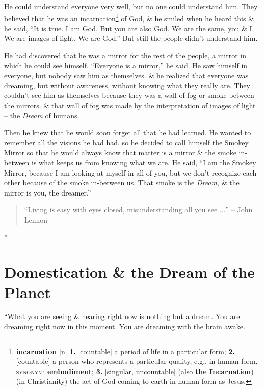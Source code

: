 \documentclass[oneside]{book}
\numberwithin{equation}{section}
\begin{document}
He could understand everyone very well, but no one could understand him. They believed that he was an incarnation\footnote{\textbf{incarnation} [n] \textbf{1.} [countable] a period of life in a particular form; \textbf{2.} [countable] a person who represents a particular quality, e.g., in human form, \textsc{synonym}: \textbf{embodiment}; \textbf{3.} [singular, uncountable] (also \textbf{the Incarnation}) (in Christianity) the act of God coming to earth in human form as Jesus.} of God, \& he smiled when he heard this \& he said, ``It is true. I am God. But you are also God. We are the same, you \& I. We are images of light. We are God.'' But still the people didn't understand him.

He had discovered that he was a mirror for the rest of the people, a mirror in which he could see himself. ``Everyone is a mirror,'' he said. He saw himself in everyone, but nobody saw him as themselves. \& he realized that everyone was dreaming, but without awareness, without knowing what they really are. They couldn't see him as themselves because they was a wall of fog or smoke between the mirrors. \& that wall of fog was made by the interpretation of images of light -- the \textit{Dream} of humans.

Then he knew that he would soon forget all that he had learned. He wanted to remember all the visions he had had, so he decided to call himself the Smokey Mirror so that he would always know that matter is a mirror \& the smoke in-between is what keeps us from knowing what we are. He said, ``I am the Smokey Mirror, because I am looking at myself in all of you, but we don't recognize each other because of the smoke in-between us. That smoke is the \textit{Dream}, \& the mirror is you, the dreamer.''
\begin{quotation}
	``Living is easy with eyes closed, misunderstanding all you see $\ldots$'' -- John Lennon
\end{quotation}
'' -- \cite[Introduction\texttt{/}The Smokey Mirror]{Ruiz2011}

\section{Domestication \& the Dream of the Planet}
``What you are seeing \& hearing right now is nothing but a dream. You are dreaming right now in this moment. You are dreaming with the brain awake.
\end{document}
